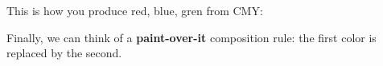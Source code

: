 \begin{comment}
We can think of many other ways to compose colors.
For example, we can think of formalizing what happens when you \textbf{mix paint}.
Red and white in equal measure give pink.
By mixing and mixing we can obtain all the shades that go from red to white.

\begin{center}
\includesag{colors-mixing}
\end{center}

\begin{marginfigure}
  \texttt{[image: additive]}
  \caption{Additive composition}
\end{marginfigure}

Colors on a monitor mix in an \textbf{additive} way. Two dark reds give a brighter red.
Red and white remains white.

\begin{center}
\includesag{colors-additive}
\end{center}

Green, red, blue additively make white:

\includesag{colors-additive-rgb}

\begin{marginfigure}
  \texttt{[image: subtractive]}
  \caption{Subtractive composition}
\end{marginfigure}

A different way to compose colors is by using the \textbf{subtractive} rules in the CMY (cyan, magenta, yellow) color space.
These rules formalize the physical process of offset printing: we produce colors by putting pigments that block the other colors.

\end{comment}

\begin{center}
\end{center}

This is how you produce red, blue, gren from CMY:


\begin{center}
  \end{center}

Finally, we can think of a \textbf{paint-over-it} composition rule: the first color is replaced by the second.

\begin{center}
\end{center}



